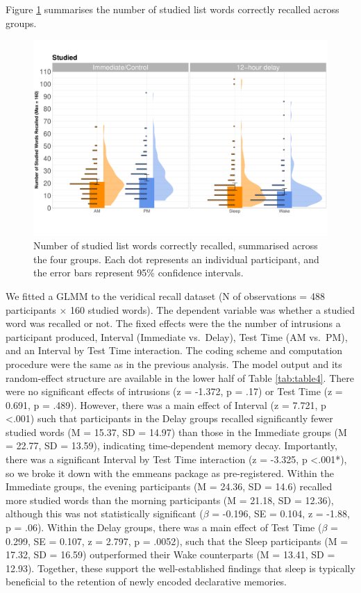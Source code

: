 \documentclass[
]{article}
\begin{document}
Figure \ref{fig:studiedfig} summarises the number of studied list words correctly recalled across groups.

\begin{figure}

{\centering \includegraphics{Figures/studiedgraph} 

}

\caption{Number of studied list words correctly recalled, summarised across the four groups. Each dot represents an individual participant, and the error bars represent 95\% confidence intervals.}\label{fig:studiedfig}
\end{figure}

We fitted a GLMM to the veridical recall dataset (N of observations = 488 participants \(\times\) 160 studied words). The dependent variable was whether a studied word was recalled or not. The fixed effects were the the number of intrusions a participant produced, Interval (Immediate vs.~Delay), Test Time (AM vs.~PM), and an Interval by Test Time interaction. The coding scheme and computation procedure were the same as in the previous analysis. The model output and its random-effect structure are available in the lower half of Table \ref{tab:table4}. There were no significant effects of intrusions (z = -1.372, p = .17) or Test Time (z = 0.691, p = .489). However, there was a main effect of Interval (z = 7.721, p \textless.001) such that participants in the Delay groups recalled significantly fewer studied words (M = 15.37, SD = 14.97) than those in the Immediate groups (M = 22.77, SD = 13.59), indicating time-dependent memory decay. Importantly, there was a significant Interval by Test Time interaction (z = -3.325, p \textless.001*), so we broke it down with the emmeans package as pre-registered. Within the Immediate groups, the evening participants (M = 24.36, SD = 14.6) recalled more studied words than the morning participants (M = 21.18, SD = 12.36), although this was not statistically significant (\(\beta\) = -0.196, SE = 0.104, z = -1.88, p = .06). Within the Delay groups, there was a main effect of Test Time (\(\beta\) = 0.299, SE = 0.107, z = 2.797, p = .0052), such that the Sleep participants (M = 17.32, SD = 16.59) outperformed their Wake counterparts (M = 13.41, SD = 12.93). Together, these support the well-established findings that sleep is typically beneficial to the retention of newly encoded declarative memories.
\end{document}
